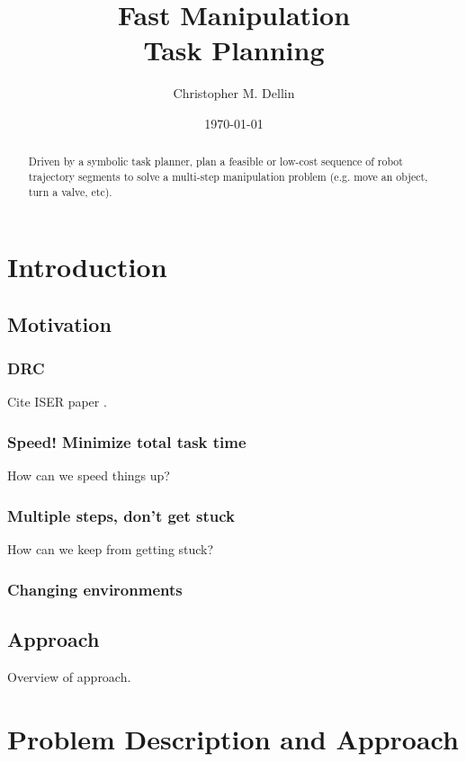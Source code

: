 \documentclass{report}
\title{Fast Manipulation\\Task Planning}
\author{Christopher M. Dellin}
\date{\today}
\begin{document}
\maketitle

\begin{abstract}
   Driven by a symbolic task planner, plan a feasible or low-cost sequence of
   robot trajectory segments to solve a multi-step manipulation problem
   (e.g. move an object, turn a valve, etc).
\end{abstract}

\tableofcontents


\newpage
\chapter{Introduction}

\section{Motivation}

\subsection{DRC}

Cite ISER paper \cite{dellin2014drc}.

\subsection{Speed! Minimize total task time}

How can we speed things up?

\subsection{Multiple steps, don't get stuck}

How can we keep from getting stuck?

\subsection{Changing environments}

\section{Approach}

Overview of approach.


\newpage
\chapter{Problem Description and Approach}
\label{chap:formulation}
\end{document}
